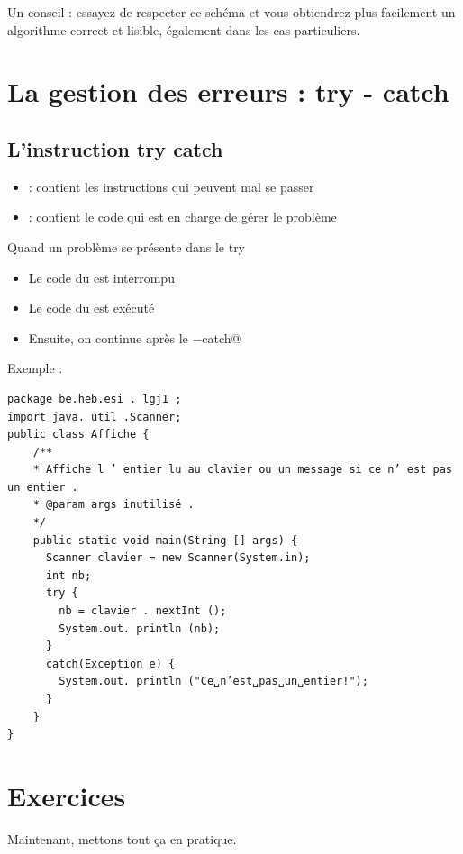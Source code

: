 \documentclass[11pt,a4paper]{article}
\begin{document}
            \par
        
        Un conseil : essayez de respecter ce sch\'ema et vous obtiendrez plus facilement un algorithme
        correct et lisible, \'egalement dans les cas particuliers.
      
            \par
        \section{La gestion des erreurs : try - catch}\subsection{L'instruction try catch}
					\begin{itemize}
				
			\item \verb@try@ : contient les instructions qui peuvent mal se passer
			\item \verb@catch@ : contient le code qui est en charge de g\'erer le probl\`eme
					\end{itemize}
				
        Quand un probl\`eme se pr\'esente dans le try
        
					\begin{itemize}
				
			\item Le code du \verb@try@ est interrompu
			\item Le code du \verb@catch@ est ex\'ecut\'e
			\item Ensuite, on continue apr\`es le \verb@try−catch@
					\end{itemize}
				
		  Exemple :
\begin{verbatim}
package be.heb.esi . lgj1 ;
import java. util .Scanner;
public class Affiche {
    /**
    * Affiche l ’ entier lu au clavier ou un message si ce n’ est pas un entier .
    * @param args inutilisé .
    */
    public static void main(String [] args) {
      Scanner clavier = new Scanner(System.in);
      int nb;
      try {
        nb = clavier . nextInt ();
        System.out. println (nb);
      }
      catch(Exception e) {
        System.out. println ("Ce␣n’est␣pas␣un␣entier!");
      }
    }
}
\end{verbatim}\section{Exercices}
				Maintenant, mettons tout \c ca en pratique.
      
\end{document}
